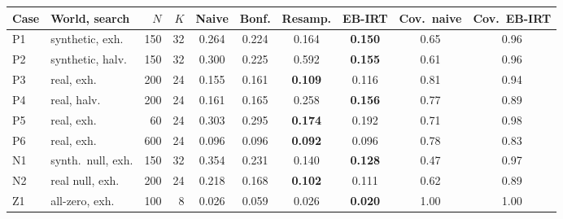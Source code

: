 \begin{tabular}{llrrcccccc}
\toprule
Case & World, search & $N$ & $K$ & Naive & Bonf. & Resamp. & EB-IRT & Cov.\ naive & Cov.\ EB-IRT \\
\midrule
P1 & synthetic, exh. & 150 & 32 & 0.264 & 0.224 & 0.164 & \textbf{0.150} & 0.65 & 0.96 \\
P2 & synthetic, halv. & 150 & 32 & 0.300 & 0.225 & 0.592 & \textbf{0.155} & 0.61 & 0.96 \\
P3 & real, exh. & 200 & 24 & 0.155 & 0.161 & \textbf{0.109} & 0.116 & 0.81 & 0.94 \\
P4 & real, halv. & 200 & 24 & 0.161 & 0.165 & 0.258 & \textbf{0.156} & 0.77 & 0.89 \\
P5 & real, exh. & 60 & 24 & 0.303 & 0.295 & \textbf{0.174} & 0.192 & 0.71 & 0.98 \\
P6 & real, exh. & 600 & 24 & 0.096 & 0.096 & \textbf{0.092} & 0.096 & 0.78 & 0.83 \\
\midrule
N1 & synth.\ null, exh. & 150 & 32 & 0.354 & 0.231 & 0.140 & \textbf{0.128} & 0.47 & 0.97 \\
N2 & real null, exh. & 200 & 24 & 0.218 & 0.168 & \textbf{0.102} & 0.111 & 0.62 & 0.89 \\
Z1 & all-zero, exh. & 100 & 8 & 0.026 & 0.059 & 0.026 & \textbf{0.020} & 1.00 & 1.00 \\
\bottomrule
\end{tabular}
